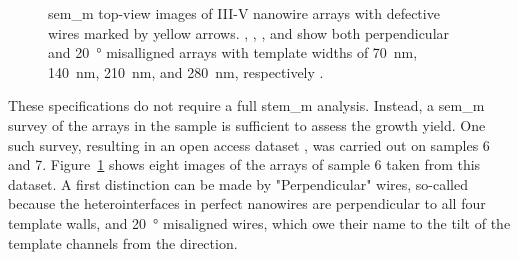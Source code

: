 \begin{figure}
{    }
    \caption[\acs{sem_m} images of nanowire arrays.]{\acs{sem_m} top-view images of III-V nanowire arrays with defective wires marked by yellow arrows. , , , and  show both perpendicular and \qty{20}{\degree} misalligned arrays with template widths of \qty{70}{nm}, \qty{140}{nm}, \qty{210}{nm}, and \qty{280}{nm}, respectively \cite{Brugnolotto2023_2}.}
    \label{fig:s7_arrays}
\end{figure}

These specifications do not require a full \acs{stem_m} analysis. Instead, a \acf{sem_m} survey of the arrays in the sample is sufficient to assess the growth yield. One such survey, resulting in an open access dataset \cite{dataset}, was carried out on samples 6 and 7. Figure~\ref{fig:s7_arrays} shows eight images of the arrays of sample 6 taken from this dataset. A first distinction can be made by "Perpendicular" wires, so-called because the heterointerfaces in perfect nanowires are perpendicular to all four template walls, and \qty{20}{\degree} misaligned wires, which owe their name to the tilt of the template channels from the  direction.

